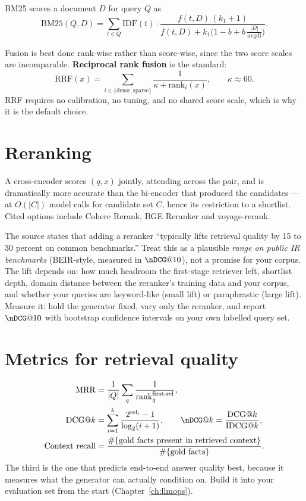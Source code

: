 \documentclass[11pt,twoside,openright]{book}
\theoremstyle{definition}
\theoremstyle{plain}
\theoremstyle{remark}
\newcommand{\term}[1]{\textbf{#1}}
\begin{document}
BM25 scores a document $D$ for query $Q$ as
\begin{equation}
  \mathrm{BM25}(Q,D) = \sum_{t \in Q} \mathrm{IDF}(t)\cdot
  \frac{f(t,D)\,(k_1+1)}{f(t,D) + k_1\bigl(1-b+b\,\frac{|D|}{\mathrm{avgdl}}\bigr)} .
\end{equation}

Fusion is best done rank-wise rather than score-wise, since the two score scales
are incomparable. \term{Reciprocal rank fusion} is the standard:
\begin{equation}
  \mathrm{RRF}(x) = \sum_{i \in \{\text{dense},\text{sparse}\}} \frac{1}{\kappa + \mathrm{rank}_i(x)},
  \qquad \kappa \approx 60 .
\label{eq:rrf}
\end{equation}
RRF requires no calibration, no tuning, and no shared score scale, which is why
it is the default choice.

\section{Reranking}

A cross-encoder scores $(q, x)$ jointly, attending across the pair, and is
dramatically more accurate than the bi-encoder that produced the candidates ---
at $O(|C|)$ model calls for candidate set $C$, hence its restriction to a
shortlist. Cited options include Cohere Rerank, BGE Reranker and voyage-rerank.

\begin{vendorwatch}
The source states that adding a reranker ``typically lifts retrieval quality by
15 to 30 percent on common benchmarks.'' Treat this as a plausible \emph{range
on public IR benchmarks} (BEIR-style, measured in $\nDCG@10$), not a promise for
your corpus. The lift depends on: how much headroom the first-stage retriever
left, shortlist depth, domain distance between the reranker's training data and
your corpus, and whether your queries are keyword-like (small lift) or
paraphrastic (large lift). Measure it: hold the generator fixed, vary only the
reranker, and report $\nDCG@10$ with bootstrap confidence intervals on your own
labelled query set.
\end{vendorwatch}

\section{Metrics for retrieval quality}
\label{sec:ir-metrics}

\begin{align}
  \mathrm{MRR} &= \frac{1}{|Q|}\sum_{q}\frac{1}{\mathrm{rank}_q^{\text{first-rel}}}, \\
  \mathrm{DCG}@k &= \sum_{i=1}^{k} \frac{2^{\mathrm{rel}_i}-1}{\log_2(i+1)},
  \qquad \nDCG@k = \frac{\mathrm{DCG}@k}{\mathrm{IDCG}@k}, \\
  \text{Context recall} &= \frac{\#\{\text{gold facts present in retrieved context}\}}{\#\{\text{gold facts}\}} .
\end{align}
The third is the one that predicts end-to-end answer quality best, because it
measures what the generator can actually condition on. Build it into your
evaluation set from the start (Chapter~\ref{ch:llmops}).
\end{document}
